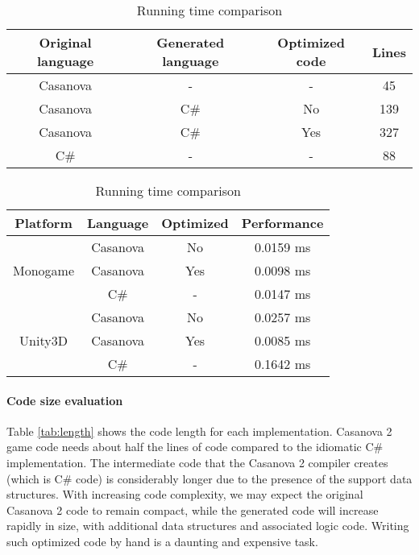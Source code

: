 \vspace*{-5pt}
\begin{table}[!ht]
\caption{Code lines comparison}
\tiny
\label{tab:length}
\centering
\begin{tabular}{ @{}|c|c|c|c|@{} }
\hline
  Original language & Generated language & Optimized code & Lines \\ \hline
  Casanova & - & - & 45 \\
  Casanova & C\# & No & 139 \\
  Casanova & C\# & Yes & 327 \\
  C\# & - & - & 88 \\ \hline
\hline
\end{tabular}
\vspace{5pt}
\caption{Running time comparison}
\tiny
\label{tab:times}
\centering
\begin{tabular}{ @{}|c|c|c|c|@{} }
\hline
 Platform & Language & Optimized & Performance\\ \hline
\multirow{3}{*}{Monogame}
  & Casanova & No & 0.0159 ms\\
  & Casanova & Yes & 0.0098 ms\\
  & C\# &   - & 0.0147 ms\\ \hline
\multirow{3}{*}{Unity3D}
  & Casanova & No & 0.0257 ms\\
  & Casanova & Yes & 0.0085 ms\\
  & C\# &   - & 0.1642 ms\\ \hline
\hline
\end{tabular}
\end{table}
\vspace{-8pt}

\paragraph*{Code size evaluation}
Table \ref{tab:length} shows the code length for each implementation. Casanova 2 game code needs about half the lines of code compared to the idiomatic C\# implementation. The intermediate code that the Casanova 2 compiler creates (which is C\# code) is considerably longer due to the presence of the support data structures. With increasing code complexity, we may expect the original Casanova 2 code to remain compact, while the generated code will increase rapidly in size, with additional data structures and associated logic code. Writing such optimized code by hand is a daunting and expensive task. 